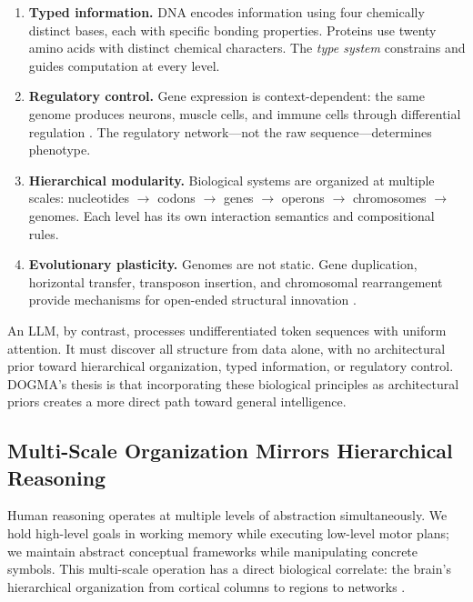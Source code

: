\begin{enumerate}[leftmargin=1.8em]
  \item \textbf{Typed information.} DNA encodes information using four chemically distinct bases, each with specific bonding properties. Proteins use twenty amino acids with distinct chemical characters. The \emph{type system} constrains and guides computation at every level.

  \item \textbf{Regulatory control.} Gene expression is context-dependent: the same genome produces neurons, muscle cells, and immune cells through differential regulation \citep{alberts2022}. The regulatory network---not the raw sequence---determines phenotype.

  \item \textbf{Hierarchical modularity.} Biological systems are organized at multiple scales: nucleotides $\to$ codons $\to$ genes $\to$ operons $\to$ chromosomes $\to$ genomes. Each level has its own interaction semantics and compositional rules.

  \item \textbf{Evolutionary plasticity.} Genomes are not static. Gene duplication, horizontal transfer, transposon insertion, and chromosomal rearrangement provide mechanisms for open-ended structural innovation \citep{lynch2007}.
\end{enumerate}

An LLM, by contrast, processes undifferentiated token sequences with uniform attention. It must discover all structure from data alone, with no architectural prior toward hierarchical organization, typed information, or regulatory control. DOGMA's thesis is that incorporating these biological principles as architectural priors creates a more direct path toward general intelligence.

\subsection{Multi-Scale Organization Mirrors Hierarchical Reasoning}

Human reasoning operates at multiple levels of abstraction simultaneously. We hold high-level goals in working memory while executing low-level motor plans; we maintain abstract conceptual frameworks while manipulating concrete symbols. This multi-scale operation has a direct biological correlate: the brain's hierarchical organization from cortical columns to regions to networks \citep{mountcastle1997}.

